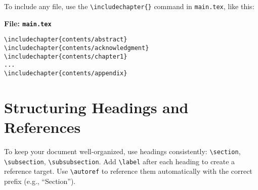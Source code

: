 \documentclass{VISTEC}
\begin{document}
\begin{paragraph}
To include any file, use the \verb|\includechapter{}| command in \texttt{main.tex}, like this:
\end{paragraph}

\noindent\textbf{File: \texttt{main.tex}}\vspace{-1.5em}
\begin{verbatim}
\includechapter{contents/abstract}
\includechapter{contents/acknowledgment}
\includechapter{contents/chapter1}
...
\includechapter{contents/appendix}
\end{verbatim}







\section{Structuring Headings and References}
\label{manual:headings}

\begin{paragraph}
To keep your document well-organized, use headings consistently: \verb|\section|, \verb|\subsection|, \verb|\subsubsection|. Add \verb|\label| after each heading to create a reference target. Use \verb|\autoref| to reference them automatically with the correct prefix (e.g., ``Section'').
\end{paragraph}
\end{document}
